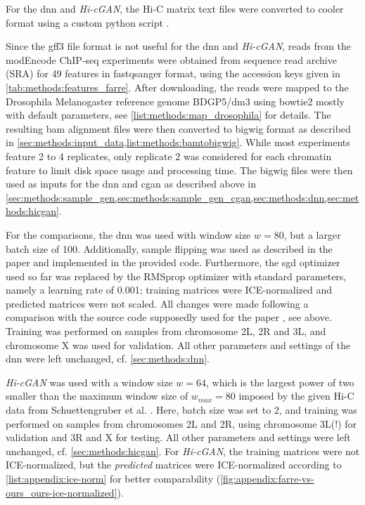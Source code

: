 For the \acrshort{dnn} and \emph{Hi-cGAN}, the Hi-C matrix text files were converted to cooler format 
using a custom python script \cite[scripts/schuettengruberToCooler.py]{Krauth2021b}.

Since the gff3 file format is not useful for the \acrshort{dnn} and \emph{Hi-cGAN}, reads from the modEncode ChIP-seq experiments \cite{Roy2010} 
were obtained from sequence read archive (SRA) for 49 features in fastqsanger format, using the accession keys given in \cref{tab:methods:features_farre}.
After downloading, the reads were mapped to the Drosophila Melanogaster reference genome BDGP5/dm3 using bowtie2 \cite{Langmead2012} 
mostly with default parameters, see \cref{list:methods:map_drosophila} for details.
The resulting bam alignment files were then converted to bigwig format as described in \cref{sec:methods:input_data,list:methods:bamtobigwig}.
While most experiments feature 2 to 4 replicates, only replicate 2 was considered for each chromatin feature to limit disk space usage and processing time.
The bigwig files were then used as inputs for the \acrshort{dnn} and \acrshort{cgan} as described above in \cref{sec:methods:sample_gen,sec:methods:sample_gen_cgan,sec:methods:dnn,sec:methods:hicgan}. 

For the comparisons, the \acrshort{dnn} was used with window size $w=80$,
but a larger batch size of 100.
Additionally, sample flipping was used as described in the paper \cite{Farre2018a} and implemented in the provided code.
Furthermore, the \acrshort{sgd} optimizer used so far was replaced by the RMS\-prop optimizer with standard parameters, namely a learning rate of 0.001;
training matrices were ICE-normalized and predicted matrices were not scaled.
All changes were made following a comparison with the source code supposedly used for the paper \cite{Farre2018a}, see above.
Training was performed on samples from chromosome 2L, 2R and 3L, and chromosome X was used for validation.
All other parameters and settings of the \acrshort{dnn} were left unchanged, cf. \cref{sec:methods:dnn}.

\emph{Hi-cGAN} was used with a window size $w=64$, which is the largest power of two 
smaller than the maximum window size of $w_\mathit{max}=80$ imposed by the given Hi-C data from Schuettengruber et al. \cite{Schuettengruber2014}.
Here, batch size was set to 2, and training was performed on samples from chromosomes 2L and 2R, 
using chromosome 3L(!) for validation and 3R and X for testing. 
All other parameters and settings were left unchanged, cf. \cref{sec:methods:hicgan}.
For \emph{Hi-cGAN}, the training matrices were not ICE-normalized, 
but the \emph{predicted} matrices were ICE-normalized according to \cref{list:appendix:ice-norm} for better comparability (\cref{fig:appendix:farre-vs-ours_ours-ice-normalized}).

